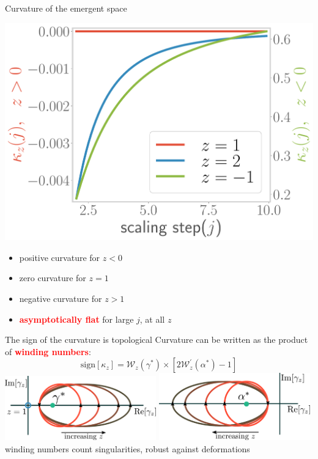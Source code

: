 \documentclass[11pt,aspectratio=169]{beamer}
\newcommand{\focus}[1]{\textcolor{red}{\bf{#1}}}
\begin{document}
\begin{frame}{Curvature of the emergent space}
\begin{minipage}{0.45\textwidth}
	\includegraphics[width=\textwidth]{figures/curvature-pos.pdf}
\end{minipage}
\begin{minipage}{0.5\textwidth}
	\begin{itemize}
		\item positive curvature for \(z < 0\)\\[10pt]
		\item zero curvature for \(z = 1\)\\[10pt]
		\item negative curvature for \(z  > 1\)\\[10pt]
		\item \focus{asymptotically flat} for large \(j\), at all \(z\)
	\end{itemize}
\end{minipage}
\end{frame}

\begin{frame}{The sign of the curvature is topological}
	Curvature can be written as the product of \focus{winding numbers}:
	\[\text{sign}\left[\kappa_z\right] = \mathcal{W}_z\left( \gamma^* \right) \times \left[2\mathcal{W}^\prime_z\left( \alpha^* \right) - 1\right] \]
	\includegraphics[width=0.49\textwidth]{figures/curvature-winding.pdf}
	\includegraphics[width=0.49\textwidth]{figures/alpha-winding.pdf}\\[10pt]
	winding numbers count singularities, robust against deformations
\end{frame}
\end{document}
